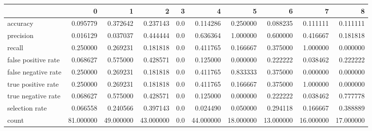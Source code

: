 \begin{tabular}{lrrrrrrrrr}
\toprule
{} &          0 &          1 &          2 &    3 &          4 &          5 &          6 &          7 &          8 \\
\midrule
accuracy            &   0.095779 &   0.372642 &   0.237143 &  0.0 &   0.114286 &   0.250000 &   0.088235 &   0.111111 &   0.111111 \\
precision           &   0.016129 &   0.037037 &   0.444444 &  0.0 &   0.636364 &   1.000000 &   0.600000 &   0.416667 &   0.181818 \\
recall              &   0.250000 &   0.269231 &   0.181818 &  0.0 &   0.411765 &   0.166667 &   0.375000 &   1.000000 &   0.000000 \\
false positive rate &   0.068627 &   0.575000 &   0.428571 &  0.0 &   0.125000 &   0.000000 &   0.222222 &   0.038462 &   0.222222 \\
false negative rate &   0.250000 &   0.269231 &   0.181818 &  0.0 &   0.411765 &   0.833333 &   0.375000 &   0.000000 &   0.000000 \\
true positive rate  &   0.250000 &   0.269231 &   0.181818 &  0.0 &   0.411765 &   0.166667 &   0.375000 &   1.000000 &   0.000000 \\
true negative rate  &   0.068627 &   0.575000 &   0.428571 &  0.0 &   0.125000 &   0.000000 &   0.222222 &   0.038462 &   0.777778 \\
selection rate      &   0.066558 &   0.240566 &   0.397143 &  0.0 &   0.024490 &   0.050000 &   0.294118 &   0.166667 &   0.388889 \\
count               &  81.000000 &  49.000000 &  43.000000 &  0.0 &  44.000000 &  18.000000 &  13.000000 &  16.000000 &  17.000000 \\
\bottomrule
\end{tabular}
